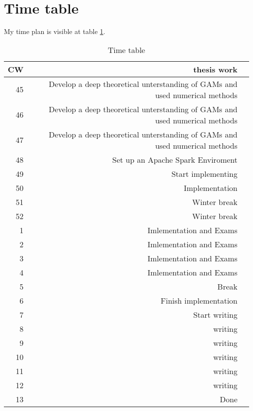 \documentclass{article}
\begin{document}
    \section{Time table}
    My time plan is visible at table \ref{timetable}.
    \begin{table}[h]
        \begin{center}
        \caption{Time table} %
        \label{timetable}
        \begin{tabular}{rrl}
            \toprule
            CW & thesis work \\
            \midrule
            45  & Develop a deep theoretical unterstanding of GAMs and used numerical methods \\
            46  & Develop a deep theoretical unterstanding of GAMs and used numerical methods \\
            47  & Develop a deep theoretical unterstanding of GAMs and used numerical methods \\
            48  & Set up an Apache Spark Enviroment \\
            49  & Start implementing  \\
            50  & Implementation \\
            51  & Winter break \\
            52  & Winter break \\
            1  & Imlementation and Exams \\
            2  & Imlementation and Exams \\
            3  & Imlementation and Exams \\
            4  & Imlementation and Exams \\
            5  & Break \\
            6  & Finish implementation \\
            7  & Start writing \\
            8  & writing \\
            9  & writing \\
            10  & writing \\
            11  & writing \\
            12  & writing \\
            13  & Done \\


        \end{tabular}
        \end{center}
    \end{table}
    \newpage


    \newpage
\end{document}
